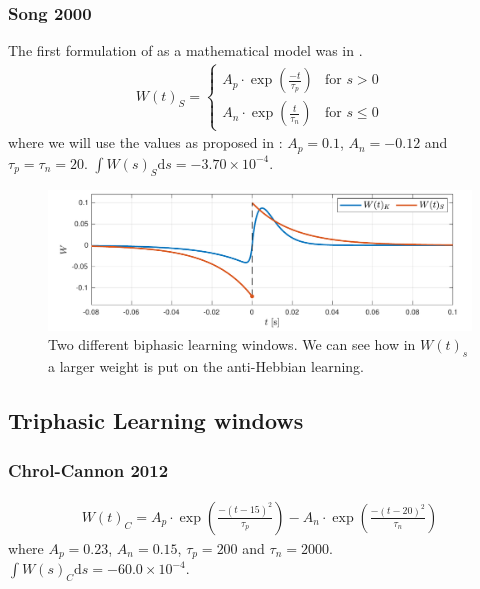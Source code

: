 \subsubsection{Song 2000}
The first formulation of \STDP as a mathematical model was in \cite{Song2000}. 
\begin{align}
W(t)_S =
\begin{cases}
A_{p} \cdot \exp \left(\frac{-t}{\tau_p}\right) & \text{for } s > 0 \\
A_{n} \cdot \exp \left(\frac{t}{\tau_n}\right)  & \text{for } s \leq 0
\end{cases} \label{eq:learningwindowKempter1999}
\end{align}
where we will use the values as proposed in \cite{ChrolCannon2012}: $A_p = 0.1$, $A_n = -0.12$ and $\tau_p = \tau_n = 20$. $\int W(s)_S \mathrm{d}s = -3.70 \times 10^{-4}$.

\begin{figure}[H]
\centering
\includegraphics[width = \textwidth]{../Figures/LearningWindowsBiphasic.pdf}
\caption{Two different biphasic learning windows. We can see how in $W(t)_s$ a larger weight is put on the anti-Hebbian learning.}
\label{fig:LearningWindowsBiphasic}
\end{figure}


\subsection{Triphasic Learning windows}

\subsubsection{Chrol-Cannon 2012}
\begin{align}
W(t)_C = A_{p} \cdot \exp \left(\frac{-\left(t - 15 \right)^{2}}{ \tau_{p}}\right) - A_{n} \cdot \exp \left(\frac{-\left(t - 20\right)^{2}}{ \tau_{n}}\right)  \label{eq:learningwindowChrolCannon2012}
\end{align}
where $A_{p}=0.23$, $A_{n}=0.15$, $\tau_{p}=200$ and $\tau_n = 2000$. $\int W(s)_C \mathrm{d}s = -60.0 \times 10^{-4}$.

